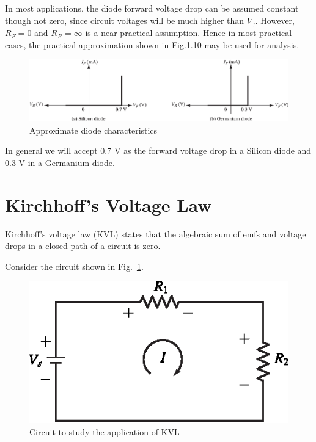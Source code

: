 

In most applications, the diode forward voltage drop can be assumed
constant though not zero, since circuit voltages will be much higher
than $V_\gamma$. However, $R_F = 0$ and $R_R = \infty$ is a
near-practical assumption. Hence in most practical cases, the
practical approximation shown in Fig.1.10 may be used for analysis.
\begin{figure}[H]
\centering
\includegraphics{chap1/S3-EE-01-017.eps}
\caption{Approximate diode characteristics}
\end{figure}

In general we will accept 0.7 V as the forward voltage drop in a
Silicon diode and 0.3 V in a Germanium diode.

\section{Kirchhoff's Voltage Law}\label{sec1.13}

Kirchhoff's voltage law (KVL) states that the algebraic sum of emfs
and voltage drops in a closed path of a circuit is zero.

Consider the circuit shown in Fig.~\ref{fig1.11}.
\begin{figure}[H]
\centering
\includegraphics{chap1/S3-EE-01-018.eps}
\caption{Circuit to study the application of KVL}\label{fig1.11}
\end{figure}

